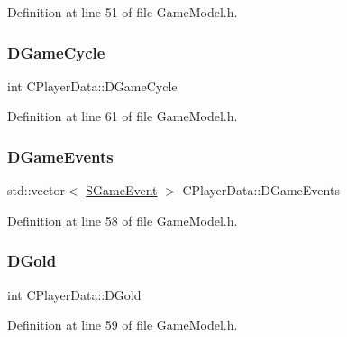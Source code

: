 Definition at line 51 of file Game\+Model.\+h.

\hypertarget{classCPlayerData_ae92ca06a63a01681dd9f3ddc17c0e106}{}\label{classCPlayerData_ae92ca06a63a01681dd9f3ddc17c0e106} 
\subsubsection{\texorpdfstring{D\+Game\+Cycle}{DGameCycle}}
{\footnotesize\ttfamily int C\+Player\+Data\+::\+D\+Game\+Cycle\hspace{0.3cm}{\ttfamily [protected]}}



Definition at line 61 of file Game\+Model.\+h.

\hypertarget{classCPlayerData_a9a7af43e88055d6d1a384a8817a655a0}{}\label{classCPlayerData_a9a7af43e88055d6d1a384a8817a655a0} 
\subsubsection{\texorpdfstring{D\+Game\+Events}{DGameEvents}}
{\footnotesize\ttfamily std\+::vector$<$ \hyperlink{structSGameEvent}{S\+Game\+Event} $>$ C\+Player\+Data\+::\+D\+Game\+Events\hspace{0.3cm}{\ttfamily [protected]}}



Definition at line 58 of file Game\+Model.\+h.

\hypertarget{classCPlayerData_afa66ff31262c9b287ae8c13259aae6f3}{}\label{classCPlayerData_afa66ff31262c9b287ae8c13259aae6f3} 
\subsubsection{\texorpdfstring{D\+Gold}{DGold}}
{\footnotesize\ttfamily int C\+Player\+Data\+::\+D\+Gold\hspace{0.3cm}{\ttfamily [protected]}}



Definition at line 59 of file Game\+Model.\+h.

\hypertarget{classCPlayerData_ad3fcb8740d4e37b4654c01c8c595e6d5}{}\label{classCPlayerData_ad3fcb8740d4e37b4654c01c8c595e6d5} 
